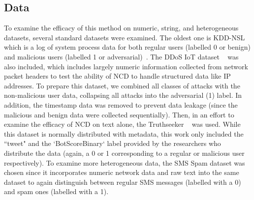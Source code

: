 \documentclass[conference]{IEEEtran}
\begin{document}
\subsection{Data}
\label{datasets}
To examine the efficacy of this method on numeric, string, and heterogeneous datasets, several standard datasets were examined. 
The oldest one is KDD-NSL which is a log of system process data for both regular users (labelled 0 or benign) and malicious users (labelled 1 or adversarial)~\cite{kddnsl}. 
The DDoS IoT dataset ~\cite{ddos} was also included, which includes largely numeric information collected from network packet headers to test the ability of NCD to handle structured data like IP addresses. 
To prepare this dataset, we combined all classes of attacks with the non-malicious user data, collapsing all attacks into the adversarial (1) label. 
In addition, the timestamp data was removed to prevent data leakage  (since the malicious and benign data were collected sequentially). 
Then, in an effort to examine the efficacy of NCD on text alone, the Truthseeker ~\cite{truthseeker} was used. 
While this dataset is normally distributed with metadata, this work only included the ``tweet" and the `BotScoreBinary` label provided by the researchers who distribute the data (again, a 0 or 1 corresponding to a regular or malicious user respectively). 
To examine more heterogeneous data, the SMS Spam dataset was chosen since it incorporates numeric network data and raw text into the same dataset to again distinguish between regular SMS messages (labelled with a 0) and spam ones (labelled with a 1). 
\end{document}

